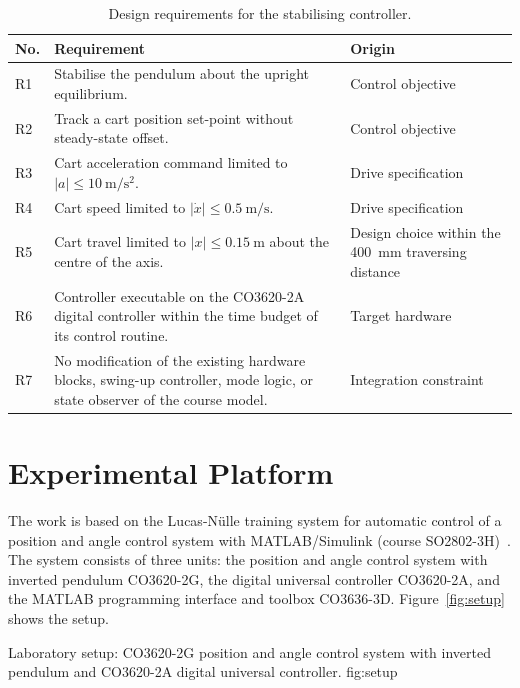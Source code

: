 \begin{table}[ht]
\centering
\caption{Design requirements for the stabilising controller.}
\label{tab:requirements}
\begin{tabular}{p{}p{}p{}}
\toprule
No. & Requirement & Origin \\
\midrule
R1 & Stabilise the pendulum about the upright equilibrium. & Control objective \\
R2 & Track a cart position set-point without steady-state offset. & Control objective \\
R3 & Cart acceleration command limited to $|a| \le 10~\mathrm{m/s^2}$. & Drive specification~\cite{ln_manual} \\
R4 & Cart speed limited to $|\dot{x}| \le 0.5~\mathrm{m/s}$. & Drive specification~\cite{ln_manual} \\
R5 & Cart travel limited to $|x| \le 0.15~\mathrm{m}$ about the centre of the axis. & Design choice within the 400~mm traversing distance \\
R6 & Controller executable on the CO3620-2A digital controller within the time budget of its control routine. & Target hardware \\
R7 & No modification of the existing hardware blocks, swing-up controller, mode logic, or state observer of the course model. & Integration constraint \\
\bottomrule
\end{tabular}
\end{table}

\section{Experimental Platform}
\label{sec:platform}

The work is based on the Lucas-Nülle training system for automatic control of a
position and angle control system with MATLAB/Simulink (course
SO2802-3H)~\cite{ln_manual}. The system consists of three units: the position
and angle control system with inverted pendulum CO3620-2G, the digital
universal controller CO3620-2A, and the MATLAB programming interface and
toolbox CO3636-3D. Figure~\ref{fig:setup} shows the setup.

  {Laboratory setup: CO3620-2G position and angle control system with inverted pendulum and CO3620-2A digital universal controller.}
  {fig:setup}

